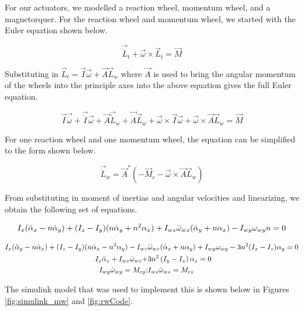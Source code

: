 For our actuators, we modelled a reaction wheel, momentum wheel, and a magnetorquer. For the reaction wheel and momentum wheel, we started with the Euler equation shown below.

\begin{equation}
    \Vec{\dot L}_t + \Vec{\omega} \times \Vec{L}_t = \Vec{M}
\end{equation}

Substituting in $\Vec{L}_t = \Vec{I} \Vec{\omega} + \Vec{A} \Vec{L}_w$ where $\Vec{A}$ is used to bring the angular momentum of the wheels into the principle axes into the above equation gives the full Euler equation.

\begin{equation}
    \Vec{I} \Vec{\dot \omega} + \Vec{\dot I} \Vec{\omega} + \Vec{A} \Vec{\dot L}_w + \Vec{\dot A} \Vec{L}_w + \Vec{\omega} \times \Vec{I} \Vec{\omega} + \Vec{\omega} \times \Vec{A} \Vec{L}_w = \Vec{M}
\end{equation}

For one reaction wheel and one momentum wheel, the equation can be simplified to the form shown below.

\begin{equation}
    \Vec{\dot L}_w = \Vec{A}^* \left( - \Vec{M}_c - \Vec{\omega} \times \Vec{A} \Vec{L}_w \right)
\end{equation}

From substituting in moment of inertias and angular velocities and linearizing, we obtain the following set of equations.

\begin{align}
    I_x (\Ddot{\alpha}_x - n \dot \alpha_y ) + (I_z - I_y) ( n \dot \alpha_y + n^2 \alpha_x ) + I_{wz}\Bar{\omega}_{wz} ( \dot \alpha_y + n \alpha_x) - I_{wy} \omega_{wy} n = 0
\end{align}

\begin{align*}
    I_x (\Ddot{\alpha}_y - n \dot \alpha_x ) + (I_z - I_y) ( n \dot \alpha_x - n^2 \alpha_y ) - I_{wz}&\Bar{\omega}_{wz} ( \dot \alpha_x + n \alpha_y) + I_{wy} \omega_{wy} - 3 n^2 (I_x - I_z) \alpha_y = 0 \\
    I_z \Ddot{\alpha}_z + I_{wz} \dot \omega_{wz} +& 3n^2\left( I_y - I_x \right) \alpha_z = 0 \\
    I_{wy} \dot \omega_{wy} = M_{cy} ;& I_{wz} \dot \omega_{wz} = M_{cz}
\end{align*}


The simulink model that was used to implement this is shown below in Figures \ref{fig:simulink_mw} and \ref{fig:rwCode}.

